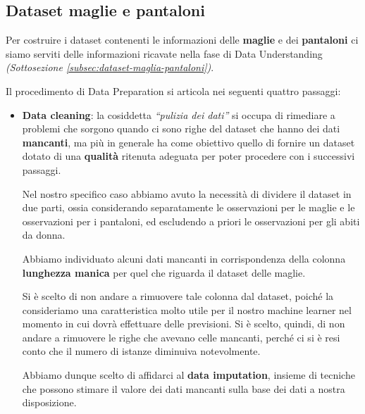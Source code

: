 \documentclass[a4paper, 11pt, oneside]{report}
\begin{document}
                \subsection{Dataset maglie e pantaloni}
                Per costruire i dataset contenenti le informazioni delle \textbf{maglie} e dei \textbf{pantaloni} ci siamo serviti delle
                informazioni ricavate nella fase di Data Understanding \textit{(Sottosezione \ref{subsec:dataset-maglia-pantaloni})}.
                \\
                \par \noindent Il procedimento di Data Preparation si articola nei seguenti quattro passaggi:
                \begin{itemize}
                    \item \textbf{Data cleaning}: la cosiddetta \textit{``pulizia dei dati''} si occupa di
                    rimediare a problemi che sorgono quando ci sono righe del dataset che hanno dei dati \textbf{mancanti}, ma più
                    in generale ha come obiettivo quello di fornire un dataset dotato di una \textbf{qualità} ritenuta adeguata
                    per poter procedere con i successivi passaggi.
                    \par \noindent Nel nostro specifico caso abbiamo avuto la necessità di dividere il dataset \cite{6} in
                    due parti, ossia considerando separatamente le osservazioni per le maglie e le osservazioni per i pantaloni,
                    ed escludendo a priori le osservazioni per gli abiti da donna.
                    \par \noindent Abbiamo individuato alcuni dati mancanti in corrispondenza della
                    colonna \textbf{lunghezza manica} per quel che riguarda il dataset delle maglie.
                    \par \noindent Si è scelto di non andare a rimuovere tale colonna dal dataset, poiché la consideriamo una caratteristica
                    molto utile per il nostro machine learner nel momento in cui dovrà effettuare delle previsioni.
                    Si è scelto, quindi, di non andare a rimuovere le righe che avevano celle mancanti,
                    perché ci si è resi conto che il numero di istanze diminuiva notevolmente.
                    \par \noindent Abbiamo dunque scelto di affidarci al \textbf{data imputation}, insieme di tecniche che
                    possono stimare il valore dei dati mancanti sulla base dei dati a nostra disposizione.

\end{itemize}
\end{document}
